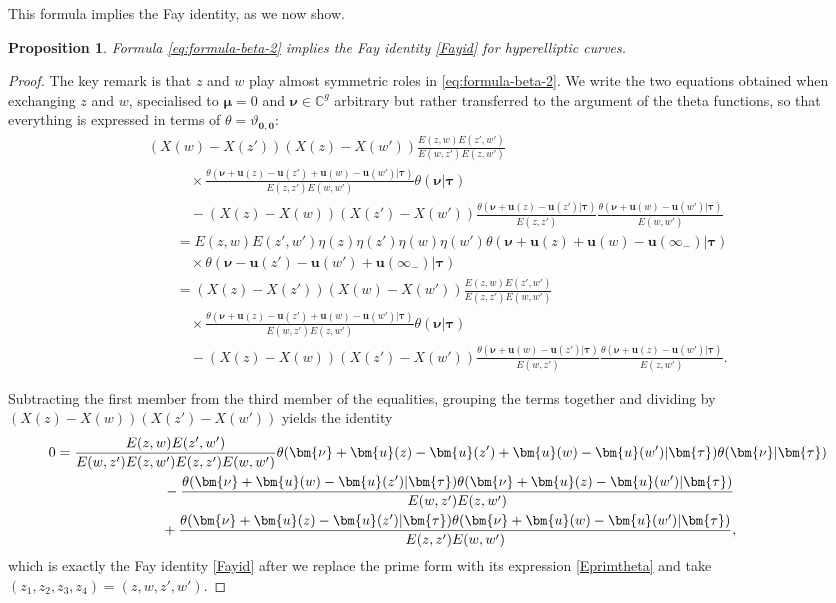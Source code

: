 \documentclass[10pt,a4paper]{amsart}
\numberwithin{equation}{section}
\newtheorem{prop}[Theorem]{Proposition}
 { \theoremstyle{definition}
\newtheorem{Definition}[Theorem]{Definition}
\newtheorem{Note}[Theorem]{Note}
\newtheorem{Example}[Theorem]{Example}
\newtheorem{Remark}[Theorem]{Remark} }
\begin{document}
This formula implies the Fay identity, as we now show.
\begin{prop}\label{corol:fay-from-beta=2}
 Formula \eqref{eq:formula-beta-2} implies the Fay identity \eqref{Fayid} for hyperelliptic curves.
\end{prop}
\begin{proof}\allowdisplaybreaks
 The key remark is that $z$ and $w$ play almost symmetric roles in
 \eqref{eq:formula-beta-2}. We write the two equations obtained when exchanging $z$ and $w$, specialised to $\bm{\mu} = 0$ and $\bm{\nu} \in \mathbb{C}^g$ arbitrary but rather transferred to the argument of the theta functions, so that everything is expressed in terms of $\theta = \vartheta_{\bm{0},\bm{0}}$:  \begin{gather*}
	 (X(w) - X(z'))(X(z) - X(w'))\frac{E(z,w)E(z',w')}{E(w,z')E(z,w')}\\
\qquad\quad{}\times \frac{\theta (\bm{\nu} + \bm{u}(z) - \bm{u}(z') + \bm{u}(w) - \bm{u}(w') |\bm{\tau} )}{E(z,z')E(w,w')}\theta (\bm{\nu} |\bm{\tau} )\\
\qquad\quad{} -(X(z) - X(w))(X(z') - X(w')) \frac{\theta(\bm{\nu} + \bm{u}(z) - \bm{u}(z') |\bm{\tau} )}{E(z,z')}\frac{\theta (\bm{\nu} + \bm{u}(w) - \bm{u}(w') |\bm{\tau} )}{E(w,w')}\\
\qquad{} = E(z,w)E(z',w')\eta(z)\eta(z')\eta(w)\eta(w')\theta (\bm{\nu} + \bm{u}(z) + \bm{u}(w) - \bm{u}(\infty_-) |\bm{\tau} )\\
\qquad\quad{}\times \theta (\bm{\nu} - \bm{u}(z') - \bm{u}(w') + \bm{u}(\infty_-) |\bm{\tau} )\\
\qquad{}  = (X(z) - X(z'))(X(w) - X(w'))\frac{E(z,w)E(z',w')}{E(z,z')E(w,w')}\\
\qquad\quad{}\times	 \frac{\theta (\bm{\nu} + \bm{u}(z) - \bm{u}(z') + \bm{u}(w) - \bm{u}(w') |\bm{\tau} )}{E(w,z')E(z,w')} \theta (\bm{\nu} |\bm{\tau} )\\
\qquad\quad{}  -(X(z)- X(w))(X(z') - X(w'))\frac{\theta (\bm{\nu} + \bm{u}(w) - \bm{u}(z') |\bm{\tau} )}{E(w,z')}\frac{\theta (\bm{\nu} + \bm{u}(z) - \bm{u}(w') |\bm{\tau} )}{E(z,w')}.
 \end{gather*}

 Subtracting the first member from the third member of the equalities, grouping the terms together and dividing by $(X(z) - X(w))(X(z') - X(w'))$ yields the identity
 \begin{gather*}
 0 =\frac{E(z,w)E(z',w')}{E(w,z')E(z,w')E(z,z')E(w,w')} \theta (\bm{\nu} + \bm{u}(z) - \bm{u}(z') + \bm{u}(w) - \bm{u}(w') |\bm{\tau} )\theta (\bm{\nu} |\bm{\tau} ) \\
\hphantom{0 =}{}
- \frac{\theta (\bm{\nu} + \bm{u}(w) - \bm{u}(z') |\bm{\tau} )\theta (\bm{\nu} + \bm{u}(z) - \bm{u}(w') |\bm{\tau} )}{E(w,z')E(z,w')}\\
\hphantom{0 =}{}
+ \frac{\theta (\bm{\nu} + \bm{u}(z) - \bm{u}(z') |\bm{\tau} )\theta (\bm{\nu} + \bm{u}(w) - \bm{u}(w') |\bm{\tau} )}{E(z,z')E(w,w')},
 \end{gather*}
 which is exactly the Fay identity \eqref{Fayid} after we replace the prime form with its expression \eqref{Eprimtheta} and take $(z_1,z_2,z_3,z_4) = (z,w,z',w')$.
 \end{proof}
\end{document}
